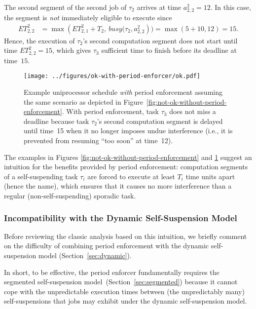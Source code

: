 The second segment of the second job of $\tau_2$ arrives at time $a_{2,2}^2 = 12$. In this case, the segment is \emph{not} immediately eligible to execute since
\begin{align*}
	ET_{2,2}^2 & = \max\left(ET_{2,1}^2 + T_2,\ \mathit{busy}(\tau_2, a_{2,2}^2\right) ) = \max(5 + 10, 12) = 15.
\end{align*}
Hence, the execution of $\tau_2$'s second computation segment does not start until time $ET_{2,2}^2 = 15$, which gives $\tau_3$ sufficient time to finish before its deadline at time~$15$.


\begin{figure}[t]
  \centering
  \texttt{[image: ../figures/ok-with-period-enforcer/ok.pdf]}
  \caption{Example uniprocessor schedule \emph{with} period enforcement assuming the same scenario as depicted in Figure~\ref{fig:not-ok-without-period-enforcement}. With period enforcement, task $\tau_3$ does not miss a deadline because task $\tau_2$'s second computation segment is delayed until time~15 when it no longer imposes undue interference (i.e., it is prevented from resuming ``too soon'' at time~12).}
  \label{fig:ok-with-period-enforcement}
\end{figure}

The examples in Figures \ref{fig:not-ok-without-period-enforcement} and \ref{fig:ok-with-period-enforcement} suggest an intuition for the benefits provided by period enforcement: computation segments of a self-suspending task $\tau_i$ are forced to execute at least $T_i$ time units apart (hence the name), which ensures that it causes no more interference than a regular (non-self-suspending) sporadic task.


\subsubsection{Incompatibility with the Dynamic Self-Suspension Model}
\label{sec:incompat}

Before reviewing the classic analysis based on this intuition, we briefly comment on the difficulty of combining period enforcement with the dynamic self-suspension model (Section~\ref{sec:dynamic}).

In short, to be effective, the period enforcer fundamentally requires the segmented self-suspension model~(Section~\ref{sec:segmented})  because it cannot cope with the unpredictable execution times between (the unpredictably many) self-suspensions that jobs may exhibit under the dynamic self-suspension model.


